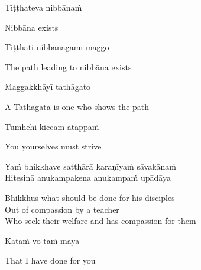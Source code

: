 \suttaRef{[Dhp 212]}

\begin{verses}
  Tiṭṭhateva nibbānaṁ
\end{verses}

\begin{english}
  Nibbāna exists
\end{english}

\begin{verses}
  Tiṭṭhati nibbānagāmī maggo
\end{verses}

\begin{english}
  The path leading to nibbāna exists
\end{english}

\begin{verses}
  Maggakkhāyī tathāgato
\end{verses}

\begin{english}
  A Tathāgata is one who shows the path
\end{english}

\suttaRef{[MN 107]}

\begin{verses}
  Tumhehi kiccam-ātappaṁ
\end{verses}

\begin{english}
  You yourselves must strive
\end{english}

\suttaRef{[Dhp 276]}

\begin{verses}
  Yaṁ bhikkhave satthārā karaṇīyaṁ sāvakānaṁ\\
  Hitesinā anukampakena anukampaṁ upādāya
\end{verses}

\begin{english-verses}
  Bhikkhus what should be done for his disciples\\
  Out of compassion by a teacher\\
  Who seek their welfare and has compassion for them
\end{english-verses}

\begin{verses}
  Kataṁ vo taṁ mayā
\end{verses}

\begin{english}
  That I have done for you
\end{english}

